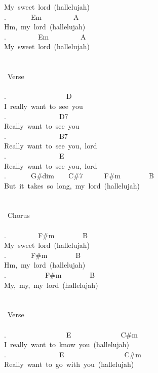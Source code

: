 {My\ sweet\ lord\ (hallelujah)\\
.\ \ \ \ \ \ \ Em\ \ \ \ \ \ \ \ \ A\\
Hm,\ my\ lord\ (hallelujah)\\
.\ \ \ \ \ \ \ \ \ Em\ \ \ \ \ \ \ \ \ A\\
My\ sweet\ lord\ (hallelujah)\\
\\
\\
\lbrack\ Verse\rbrack\\
\\
.\ \ \ \ \ \ \ \ \ \ \ \ \ \ \ \ \ D\ \ \\
I\ really\ want\ to\ see\ you\\
.\ \ \ \ \ \ \ \ \ \ \ \ \ \ \ D7\ \ \\
Really\ want\ to\ see\ you\\
.\ \ \ \ \ \ \ \ \ \ \ \ \ \ \ B7\\
Really\ want\ to\ see\ you,\ lord\\
.\ \ \ \ \ \ \ \ \ \ \ \ \ \ \ E\\
Really\ want\ to\ see\ you,\ lord\\
.\ \ \ \ \ \ \ G\#dim\ \ \ \ C\#7\ \ \ \ \ \ F\#m\ \ \ \ \ \ \ \ B\\
But\ it\ takes\ so\ long,\ my\ lord\ (hallelujah)\\
\\
\\
\lbrack\ Chorus\rbrack\\
\\
.\ \ \ \ \ \ \ \ \ F\#m\ \ \ \ \ \ \ \ B\\
My\ sweet\ lord\ (hallelujah)\\
.\ \ \ \ \ \ \ F\#m\ \ \ \ \ \ \ \ B\\
Hm,\ my\ lord\ (hallelujah)\\
.\ \ \ \ \ \ \ \ \ \ \ F\#m\ \ \ \ \ \ \ \ B\ \\
My,\ my,\ my\ lord\ (hallelujah)\\
\\
\\
\lbrack\ Verse\rbrack\\
\\
.\ \ \ \ \ \ \ \ \ \ \ \ \ \ \ \ \ E\ \ \ \ \ \ \ \ \ \ \ \ \ \ C\#m\ \\
I\ really\ want\ to\ know\ you\ (hallelujah)\\
.\ \ \ \ \ \ \ \ \ \ \ \ \ \ \ E\ \ \ \ \ \ \ \ \ \ \ \ \ \ \ \ \ C\#m\\
Really\ want\ to\ go\ with\ you\ (hallelujah)\\
}
